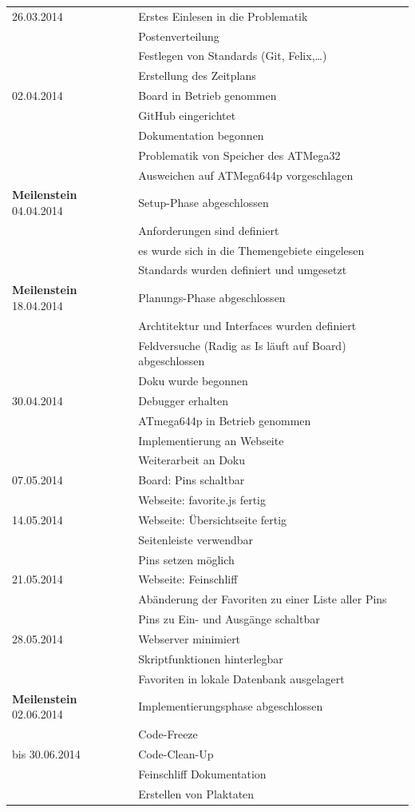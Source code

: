 \begin{table}[H]
\begin{tabular}{ll}
26.03.2014 & Erstes Einlesen in die Problematik \\
& Postenverteilung\\
& Festlegen von Standards (Git, Felix,\ldots) \\
& Erstellung des Zeitplans \\
02.04.2014 & Board in Betrieb genommen\\
& GitHub eingerichtet\\ 
&Dokumentation begonnen\\ 
& Problematik von Speicher des ATMega32\\
& Ausweichen auf ATMega644p vorgeschlagen \\
\textbf{Meilenstein} 04.04.2014 & Setup-Phase abgeschlossen \\
& Anforderungen sind definiert\\
& es wurde sich in die 
Themengebiete eingelesen\\
& Standards wurden definiert und umgesetzt\\
\textbf{Meilenstein} 18.04.2014 & Planungs-Phase abgeschlossen \\
& Archtitektur und Interfaces wurden definiert\\
& Feldversuche (Radig as Is läuft auf Board) abgeschlossen \\
& Doku wurde begonnen\\
30.04.2014 & Debugger erhalten\\
& ATmega644p in Betrieb genommen\\
& Implementierung an Webseite\\
& Weiterarbeit an Doku\\
07.05.2014 & Board: Pins schaltbar
\\
& Webseite: favorite.js fertig \\
14.05.2014 & Webseite: Übersichtseite fertig\\
& Seitenleiste verwendbar\\
& Pins setzen möglich\\
21.05.2014 & Webseite: Feinschliff\\ 
&Abänderung der Favoriten zu einer Liste aller Pins\\
& Pins zu Ein- und Ausgänge schaltbar \\
28.05.2014 & Webserver minimiert\\
& Skriptfunktionen hinterlegbar\\
& Favoriten in lokale Datenbank ausgelagert \\
\textbf{Meilenstein} 02.06.2014 & Implementierungsphase abgeschlossen \\
& Code-Freeze\\
bis 30.06.2014 & Code-Clean-Up\\
& Feinschliff Dokumentation\\
& Erstellen von Plaktaten\\
\end{tabular}
\end{table}


